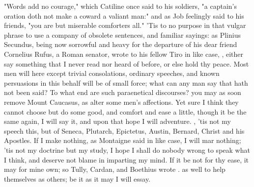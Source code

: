 {"Words add no courage," which Catiline once said to his soldiers, "a captain's oration doth not make a coward a valiant man:" and as Job feelingly said to his friends, "you are but miserable comforters all." 'Tis to no purpose in that vulgar phrase to use a company of obsolete sentences, and familiar sayings: as Plinius Secundus, being now sorrowful and heavy for the departure of his dear friend Cornelius Rufus, a Roman senator, wrote to his fellow Tiro in like case, , either say something that I never read nor heard of before, or else hold thy peace. Most men will here except trivial consolations, ordinary speeches, and known persuasions in this behalf will be of small force; what can any man say that hath not been said? To what end are such paraenetical discourses? you may as soon remove Mount Caucasus, as alter some men's affections. Yet sure I think they cannot choose but do some good, and comfort and ease a little, though it be the same again, I will say it, and upon that hope I will adventure. , 'tis not my speech this, but of Seneca, Plutarch, Epictetus, Austin, Bernard, Christ and his Apostles. If I make nothing, as Montaigne said in like case, I will mar nothing; 'tis not my doctrine but my study, I hope I shall do nobody wrong to speak what I think, and deserve not blame in imparting my mind. If it be not for thy ease, it may for mine own; so Tully, Cardan, and Boethius wrote . as well to help themselves as others; be it as it may I will essay.

}
